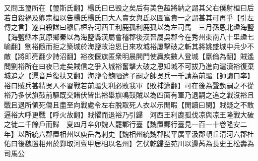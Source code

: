 又問玉璽所在【璽斯氏翻】楊氏曰已毁之矣后有美色超將納之謂其父右僕射桓曰后若自殺禍及卿宗桓以告楊氏楊氏曰大人賣女與氐以圖富貴一之謂甚其可再乎【引左傳之言】遂自殺諡曰穆后桓犇河西王利鹿孤利鹿孤以為左司馬　三月孫恩北趣海鹽【海鹽縣本武原鄉秦以為海鹽縣漢屬會稽郡後漢晉屬吳郡今在秀州東南八十里趣七喻翻】劉裕隨而拒之築城於海鹽故治恩日來攻城裕屢擊破之斬其將姚盛城中兵少不敵【將即亮翻少詩沼翻】裕夜偃旗匿衆明晨開門使羸疾數人登城【羸倫為翻】賊遙問劉裕所在曰夜已走矣賊信之爭入城裕奮擊大破之恩知城不可拔乃進向滬瀆裕復棄城追之【滬音戶復扶又翻】海鹽令鮑陋遣子嗣之帥吳兵一千請為前驅【帥讀曰率】裕曰賊兵甚精吳人不習戰若前驅失利必敗我軍【敗補邁翻】可在後為聲埶嗣之不從裕乃多伏旗鼓前驅既交諸伏皆出裕舉旗鳴鼓賊以為四面有軍乃退嗣之追之戰沒裕且戰且退所領死傷且盡至向戰處令左右脱取死人衣以示閒暇【閒讀曰閑】賊疑之不敢逼裕大呼更戰【呼火故翻】賊懼而退裕乃引歸　河西王利鹿孤伐凉與凉王隆戰大破之徙二千餘戶而歸　夏四月辛卯魏人罷鄴行臺【魏置鄴行臺見一百一十卷隆安二年】以所統六郡置相州以庾岳為刺史【魏相州統魏郡陽平廣平汲郡頓丘清河六郡杜佑曰後魏置相州於鄴取河亶甲居相以名州】乞伏乾歸至苑川以邊芮為長史王松壽為司馬公

